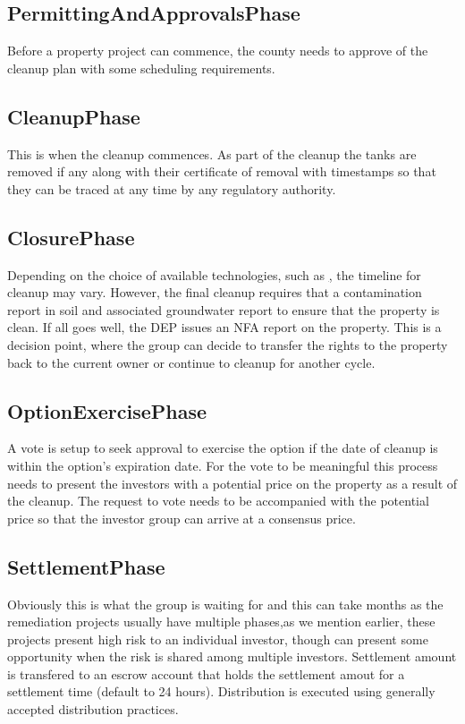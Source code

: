 \documentclass{article}
\begin{document}
  \subsection{PermittingAndApprovalsPhase}
  Before a property project can commence, the county needs to approve of the cleanup plan with some scheduling requirements. 

  \subsection{CleanupPhase}
  This is when the cleanup commences. As part of the cleanup the tanks are removed if any along with their certificate of removal with timestamps so that they can be traced at any time by any regulatory authority. 

  \subsection{ClosurePhase}
  Depending on the choice of available technologies, such as \href{https://shop.sarvabioremed.com/collections/vaporremed}, the timeline for cleanup may vary. However, the final cleanup requires that a contamination report in soil and associated groundwater report to ensure that the property is clean. If all goes well, the DEP issues an NFA report on the property. This is a decision point, where the group can decide to transfer the rights to the property back to the current owner or continue to cleanup for another cycle. 

  \subsection{OptionExercisePhase}
  A vote is setup to seek approval to exercise the option if the date of cleanup is within the option's expiration date. For the vote to be meaningful this process needs to present the investors with a potential price on the property as a result of the cleanup. The request to vote needs to be accompanied with the potential price so that the investor group can arrive at a consensus price. 

  \subsection{SettlementPhase}
  Obviously this is what the group is waiting for and this can take months as the remediation projects usually have multiple phases,as we mention earlier, these projects present high risk to an individual investor, though can present some opportunity when the risk is shared among multiple investors. Settlement amount is transfered to an escrow account that holds the settlement amout for a settlement time (default to 24 hours). Distribution is executed using generally accepted distribution practices.
\end{document}
